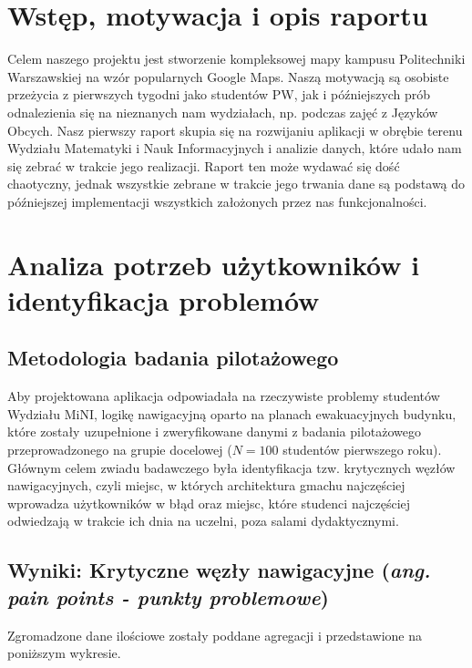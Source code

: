\documentclass[14pt,a4paper]{extarticle}
\begin{document}
\section{Wstęp, motywacja i opis raportu}

Celem naszego projektu jest stworzenie kompleksowej mapy kampusu Politechniki Warszawskiej na wzór popularnych Google Maps. Naszą motywacją są osobiste przeżycia z pierwszych tygodni jako studentów PW, jak i późniejszych prób odnalezienia się na nieznanych nam wydziałach, np. podczas zajęć z Języków Obcych. Nasz pierwszy raport skupia się na rozwijaniu aplikacji w obrębie terenu Wydziału Matematyki i Nauk Informacyjnych i analizie danych, które udało nam się zebrać w trakcie jego realizacji. Raport ten może wydawać się dość chaotyczny, jednak wszystkie zebrane w trakcie jego trwania dane są podstawą do późniejszej implementacji wszystkich założonych przez nas funkcjonalności.

\section{Analiza potrzeb użytkowników i identyfikacja problemów}

\subsection{Metodologia badania pilotażowego}

Aby projektowana aplikacja odpowiadała na rzeczywiste problemy studentów Wydziału MiNI, logikę nawigacyjną oparto na planach ewakuacyjnych budynku, które zostały uzupełnione i zweryfikowane danymi z badania pilotażowego przeprowadzonego na grupie docelowej ($N = 100$ studentów pierwszego roku). Głównym celem zwiadu badawczego była identyfikacja tzw. krytycznych węzłów nawigacyjnych, czyli miejsc, w których architektura gmachu najczęściej wprowadza użytkowników w błąd oraz miejsc, które studenci najczęściej odwiedzają w trakcie ich dnia na uczelni, poza salami dydaktycznymi.

\subsection{Wyniki: Krytyczne węzły nawigacyjne (\textit{ang. pain points - punkty problemowe})}

Zgromadzone dane ilościowe zostały poddane agregacji i przedstawione na poniższym wykresie.
\end{document}
